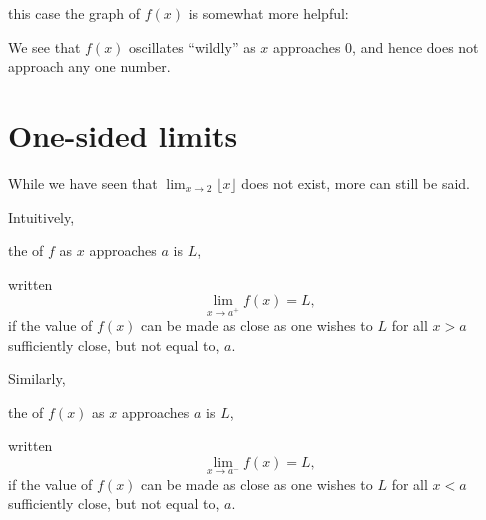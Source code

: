 \documentclass{ximera}
\begin{document}
\begin{question}
\begin{feedback}
    this case the graph of $f(x)$ is somewhat more helpful:
    \begin{image}
    \end{image}
   We see that $f(x)$ oscillates ``wildly'' as $x$ approaches $0$, and hence does not approach any one number.
  \end{feedback}
\end{question}



\section{One-sided limits}


While we have seen that $\lim_{x\to 2}\lfloor x\rfloor$ does not
exist, more can still be said.



\begin{definition}
  Intuitively,
  \begin{center}
    the  of $f$ as $x$ approaches $a$ is
    $L$,
  \end{center}
  written
  \[
  \lim_{x\to a^+} f(x) = L,
  \]
  if the value of $f(x)$ can be made as close as one wishes to $L$ for
  all $x>a$ sufficiently close, but not equal to, $a$.
  
  Similarly,
  \begin{center}
    the  of $f(x)$ as $x$ approaches $a$ is
    $L$,
  \end{center}
  written
  \[
  \lim_{x\to a^-} f(x) = L,
  \]
  if the value of $f(x)$ can be made as close as one wishes to $L$ for
  all $x<a$ sufficiently close, but not equal to, $a$.
\end{definition}
\end{document}
